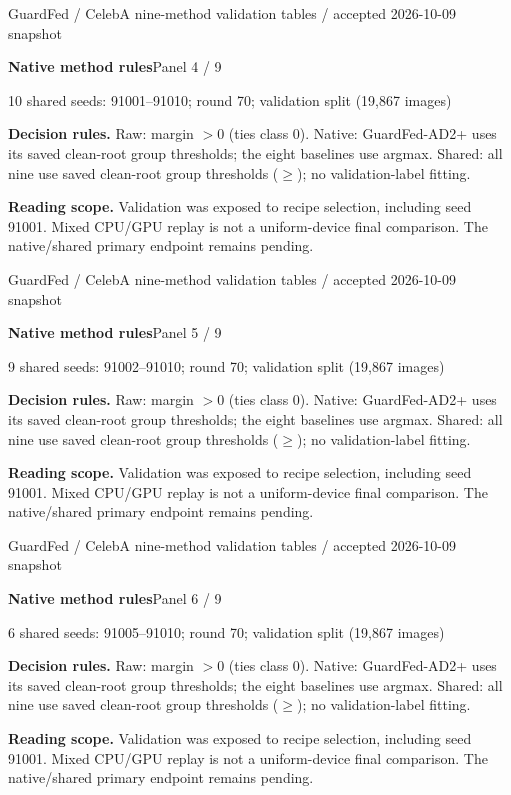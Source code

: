 \documentclass[11pt]{article}
\begin{document}
\newpage
{\small GuardFed / CelebA nine-method validation tables / accepted 2026-10-09 snapshot}\par\medskip
{\LARGE\bfseries Native method rules}\hfill{\large Panel 4 / 9}\par\smallskip
{\large 10 shared seeds: 91001--91010; round 70; validation split (19,867 images)}\par\medskip

\par\medskip
{\footnotesize\textbf{Decision rules.} Raw: margin $>0$ (ties class 0). Native: GuardFed-AD2+ uses its saved clean-root group thresholds; the eight baselines use argmax. Shared: all nine use saved clean-root group thresholds ($\geq$); no validation-label fitting.\par
\textbf{Reading scope.} Validation was exposed to recipe selection, including seed 91001. Mixed CPU/GPU replay is not a uniform-device final comparison. The native/shared primary endpoint remains pending.}

\newpage
{\small GuardFed / CelebA nine-method validation tables / accepted 2026-10-09 snapshot}\par\medskip
{\LARGE\bfseries Native method rules}\hfill{\large Panel 5 / 9}\par\smallskip
{\large 9 shared seeds: 91002--91010; round 70; validation split (19,867 images)}\par\medskip

\par\medskip
{\footnotesize\textbf{Decision rules.} Raw: margin $>0$ (ties class 0). Native: GuardFed-AD2+ uses its saved clean-root group thresholds; the eight baselines use argmax. Shared: all nine use saved clean-root group thresholds ($\geq$); no validation-label fitting.\par
\textbf{Reading scope.} Validation was exposed to recipe selection, including seed 91001. Mixed CPU/GPU replay is not a uniform-device final comparison. The native/shared primary endpoint remains pending.}

\newpage
{\small GuardFed / CelebA nine-method validation tables / accepted 2026-10-09 snapshot}\par\medskip
{\LARGE\bfseries Native method rules}\hfill{\large Panel 6 / 9}\par\smallskip
{\large 6 shared seeds: 91005--91010; round 70; validation split (19,867 images)}\par\medskip

\par\medskip
{\footnotesize\textbf{Decision rules.} Raw: margin $>0$ (ties class 0). Native: GuardFed-AD2+ uses its saved clean-root group thresholds; the eight baselines use argmax. Shared: all nine use saved clean-root group thresholds ($\geq$); no validation-label fitting.\par
\textbf{Reading scope.} Validation was exposed to recipe selection, including seed 91001. Mixed CPU/GPU replay is not a uniform-device final comparison. The native/shared primary endpoint remains pending.}
\end{document}
